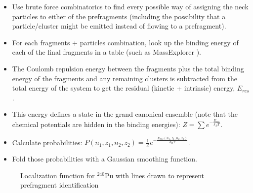 \begin{itemize}
	\item Use brute force combinatorics to find every possible way of assigning the neck particles to either of the prefragments (including the possibility that a particle/cluster might be emitted instead of flowing to a prefragment).
	\item For each fragments + particles combination, look up the binding energy of each of the final fragments in a table (such as  MassExplorer \cite{massexplorer}).
	\item The Coulomb repulsion energy between the fragments plus the total binding energy of the fragments and any remaining clusters is subtracted from the total energy of the system to get the residual (kinetic + intrinsic) energy, $E_{res}$.
	\item This energy defines a state in the grand canonical ensemble (note that the chemical potentials are hidden in the binding energies): $Z = \sum e^{-\frac{E_{res}}{k_BT}}$.
	\item Calculate probabilities: $P(n_1,z_1,n_2,z_2) = \frac{1}{Z} e^{-\frac{E_{res}(n_1,z_1,n_2,z_2)}{k_BT}}$.
	\item Fold those probabilities with a Gaussian smoothing function.
\end{itemize}

\begin{figure}%
	\centering
	\qquad
	\caption{Localization function for $^{240}$Pu with lines drawn to represent prefragment identification}%
	\label{fig:methods240Pulocali}%
\end{figure}



